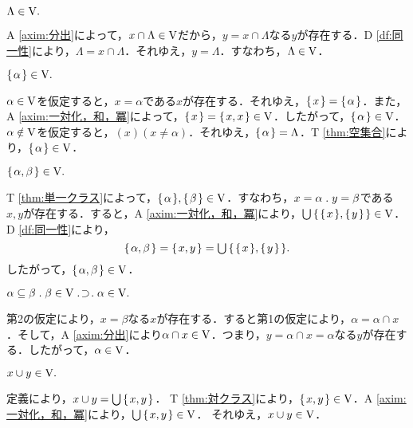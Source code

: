 \begin{thm}[空集合]
\label{thm:空集合}
$
    \Lambda\in\mathrm{V}.
$
\end{thm}
\begin{pf}
    A \ref{axim:分出}によって，$x\cap\Lambda\in\mathrm{V}$だから，$ y = x\cap\Lambda $なる$y$が存在する．D \ref{df:同一性}により，$ \Lambda = x\cap\Lambda $．それゆえ，$ y = \Lambda $．すなわち，$ \Lambda\in\mathrm{V} $．
\end{pf}

\begin{thm}[単一クラス]
\label{thm:単一クラス}
$
    \{\mspace{2mu}\alpha\mspace{2mu}\}\in\mathrm{V}.
$
\end{thm}
\begin{pf}
    $\alpha\in\mathrm{V}$を仮定すると，$x = \alpha$である$x$が存在する．それゆえ，$ \{\mspace{2mu}x\mspace{2mu}\}=\{\mspace{2mu}\alpha\mspace{2mu}\} $．また，A \ref{axim:一対化，和，冪}によって，$\{\mspace{2mu}x\mspace{2mu}\}=\{\mspace{2mu}x,x\mspace{2mu}\}\in\mathrm{V}$．したがって，$\{\mspace{2mu}\alpha\mspace{2mu}\}\in\mathrm{V}$．
    $\alpha\notin\mathrm{V}$を仮定すると，$(x)(x\neq\alpha)$．それゆえ，$\{\mspace{2mu}\alpha\mspace{2mu}\}=\Lambda$．T \ref{thm:空集合}により，$\{\mspace{2mu}\alpha\mspace{2mu}\}\in\mathrm{V}$．
\end{pf}

\begin{thm}[対クラス]
\label{thm:対クラス}
$
    \{\mspace{2mu}\alpha,\beta\mspace{2mu}\}\in\mathrm{V}.
$
\end{thm}
\begin{pf}
    T \ref{thm:単一クラス}によって，$\{\mspace{2mu}\alpha\mspace{2mu}\},\{\mspace{2mu}\beta\mspace{2mu}\}\in\mathrm{V}$．すなわち，$ x = \alpha\con{1}y = \beta $である$ x,y $が存在する．すると，A \ref{axim:一対化，和，冪}により，${\textstyle\bigcup}\mspace{3mu}\{\mspace{2mu}\{\mspace{2mu}x\mspace{2mu}\},\{\mspace{2mu}y\mspace{2mu}\}\mspace{2mu}\}\in\mathrm{V}$．D \ref{df:同一性}により，
    \[
        \{\mspace{2mu}\alpha,\beta\mspace{2mu}\}=\{\mspace{2mu}x,y\mspace{2mu}\}={\textstyle\bigcup}\mspace{3mu}\{\mspace{2mu}\{\mspace{2mu}x\mspace{2mu}\},\{\mspace{2mu}y\mspace{2mu}\}\mspace{2mu}\}.
    \]
    したがって，$ \{\mspace{2mu}\alpha,\beta\mspace{2mu}\}\in\mathrm{V} $．
\end{pf}

\begin{thm}[部分クラス]
\label{thm:部分クラス}
$
    \alpha\subseteq\beta\con{1}\beta\in\univ\case{1}{1}{1}\alpha\in\univ.
$
\end{thm}
\begin{pf}
    第2の仮定により，$ x = \beta $なる$ x $が存在する．すると第1の仮定により，$ \alpha = \alpha\cap x $．そして，A \ref{axim:分出}により$ \alpha\cap x\in\mathrm{V} $．つまり，$ y = \alpha\cap x=\alpha $なる$ y $が存在する．したがって，$\alpha\in\mathrm{V}$．
\end{pf}

\begin{thm}[合併]
\label{thm:合併}
$
    x\cup y\in\mathrm{V}.
$
\end{thm}
\begin{pf}
    定義により，$ x\cup y = {\textstyle\bigcup}\mspace{3mu}\{\mspace{2mu}x,y\mspace{2mu}\} $．
    T \ref{thm:対クラス}により，$\{\mspace{2mu}x,y\mspace{2mu}\}\in\mathrm{V}$．A \ref{axim:一対化，和，冪}により，$ {\textstyle\bigcup}\mspace{3mu}\{\mspace{2mu}x,y\mspace{2mu}\}\in\mathrm{V} $．
    それゆえ，$ x\cup y\in\mathrm{V} $．
\end{pf}
    
